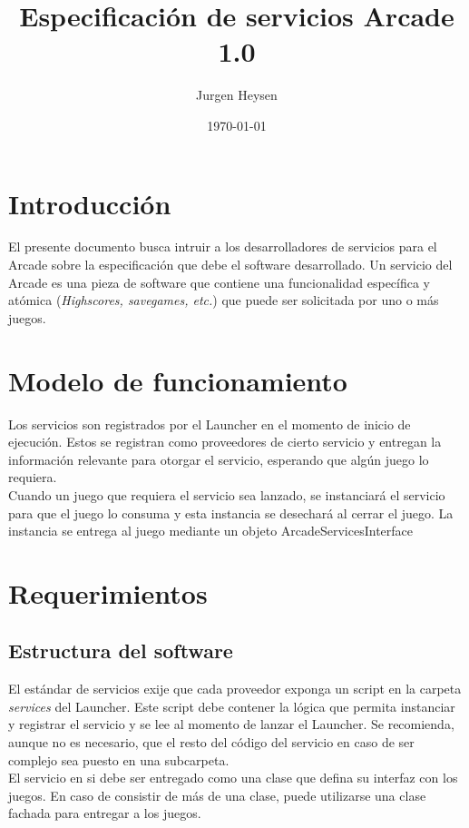 \documentclass[language=spanish]{article}
\begin{document}
\title{Especificación de servicios Arcade 1.0}
\author{Jurgen Heysen}
\date{\today}
\maketitle
\newpage

\tableofcontents
\newpage

\section{Introducción}

El presente documento busca intruir a los desarrolladores de servicios para el Arcade sobre la especificación que debe el software desarrollado.
Un servicio del Arcade es una pieza de software que contiene una funcionalidad específica y atómica ({\em Highscores, savegames, etc.}) que puede ser solicitada por uno o más juegos.

\section{Modelo de funcionamiento}

Los servicios son registrados por el Launcher en el momento de inicio de ejecución. Estos se registran como proveedores de cierto servicio y entregan la información relevante para otorgar el servicio, esperando que algún juego lo requiera.\\
Cuando un juego que requiera el servicio sea lanzado, se instanciará el servicio para que el juego lo consuma y esta instancia se desechará al cerrar el juego. La instancia se entrega al juego mediante un objeto ArcadeServicesInterface

\section{Requerimientos}

\subsection{Estructura del software}

El estándar de servicios exije que cada proveedor exponga un script en la carpeta {\em services} del Launcher. Este script debe contener la lógica que permita instanciar y registrar el servicio y se lee al momento de lanzar el Launcher. Se recomienda, aunque no es necesario, que el resto del código del servicio en caso de ser complejo sea puesto en una subcarpeta.\\
El servicio en si debe ser entregado como una clase que defina su interfaz con los juegos. En caso de consistir de más de una clase, puede utilizarse una clase fachada para entregar a los juegos.
\end{document}
